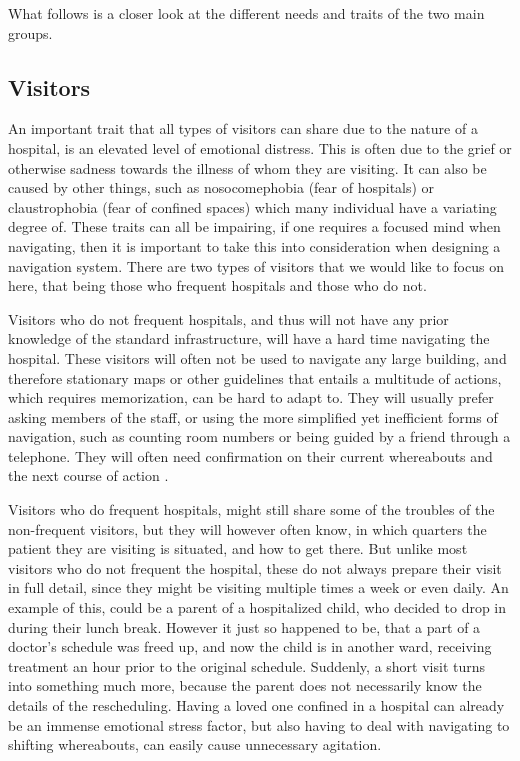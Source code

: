 What follows is a closer look at the different needs and traits of the two main groups.

\subsection{Visitors} %
 \label{par:vistors}
 
An important trait that all types of visitors can share due to the nature of a hospital, is an elevated level of emotional distress. This is often due to the grief or otherwise sadness towards the illness of whom they are visiting. It can also be caused by other things, such as nosocomephobia (fear of hospitals) or claustrophobia (fear of confined spaces) which many individual have a variating degree of\cite{individforskelle}. These traits can all be impairing, if one requires a focused mind when navigating, then it is important to take this into consideration when designing a navigation system. There are two types of visitors that we would like to focus on here, that being those who frequent hospitals and those who do not.

Visitors who do not frequent hospitals, and thus will not have any prior knowledge of the standard infrastructure, will have a hard time navigating the hospital. These visitors will often not be used to navigate any large building, and therefore stationary maps or other guidelines that entails a multitude of actions, which requires memorization, can be hard to adapt to. They will usually prefer asking members of the staff, or using the more simplified yet inefficient forms of navigation, such as counting room numbers or being guided by a friend through a telephone. They will often need confirmation on their current whereabouts and the next course of action \cite{naturtalenter,individforskelle}.

Visitors who do frequent hospitals, might still share some of the troubles of the non-frequent visitors, but they will however often know, in which quarters the patient they are visiting is situated, and how to get there. But unlike most visitors who do not frequent the hospital, these do not always prepare their visit in full detail, since they might be visiting multiple times a week or even daily. An example of this, could be a parent of a hospitalized child, who decided to drop in during their lunch break. However it just so happened to be, that a part of a doctor's schedule was freed up, and now the child is in another ward, receiving treatment an hour prior to the original schedule. Suddenly, a short visit turns into something much more, because the parent does not necessarily know the details of the rescheduling. Having a loved one confined in a hospital can already be an immense emotional stress factor, but also having to deal with navigating to shifting whereabouts, can easily cause unnecessary agitation.

